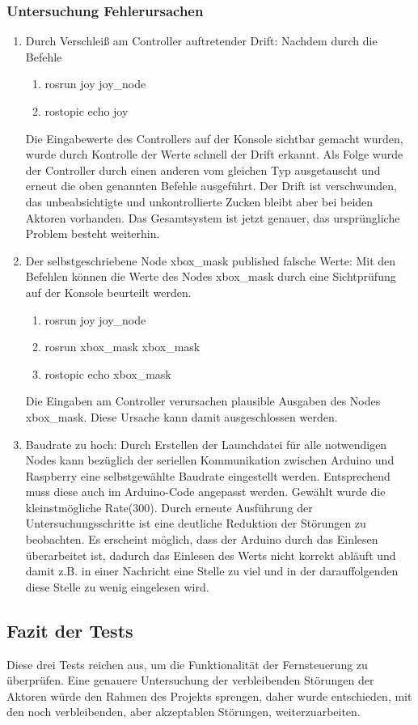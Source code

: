 \subsubsection{Untersuchung Fehlerursachen}
\begin{enumerate}
	\item Durch Verschleiß am Controller auftretender Drift: Nachdem durch die Befehle 
	\begin{enumerate}[label=\arabic*.]
		\item rosrun joy joy\_node
		\item rostopic echo joy
	\end{enumerate}
	Die Eingabewerte des Controllers auf der Konsole sichtbar gemacht wurden, wurde durch Kontrolle der Werte schnell der Drift erkannt. Als Folge wurde der Controller durch einen anderen vom gleichen Typ ausgetauscht und erneut die oben genannten Befehle ausgeführt. Der Drift ist verschwunden, das unbeabsichtigte und unkontrollierte Zucken bleibt aber bei beiden Aktoren vorhanden. Das Gesamtsystem ist jetzt genauer, das ursprüngliche Problem besteht weiterhin.
	\item Der selbstgeschriebene Node xbox\_mask published falsche Werte: Mit den Befehlen können die Werte des Nodes xbox\_mask durch eine Sichtprüfung auf der Konsole beurteilt werden. 
	\begin{enumerate} [label=\arabic*.]
		\item rosrun joy joy\_node
		\item rosrun xbox\_mask xbox\_mask
		\item rostopic echo xbox\_mask
	\end{enumerate}
	Die Eingaben am Controller verursachen plausible Ausgaben des Nodes xbox\_mask. Diese Ursache kann damit ausgeschlossen werden.
	\item Baudrate zu hoch: Durch Erstellen der Launchdatei für alle notwendigen Nodes kann bezüglich der seriellen Kommunikation zwischen Arduino und Raspberry eine selbstgewählte Baudrate eingestellt werden. Entsprechend muss diese auch im Arduino-Code angepasst werden. Gewählt wurde die kleinstmögliche Rate(300). Durch erneute Ausführung der Untersuchungsschritte ist eine deutliche Reduktion der Störungen zu beobachten. Es erscheint möglich, dass der Arduino durch das Einlesen überarbeitet ist, dadurch das Einlesen des Werts nicht korrekt abläuft und damit z.B. in einer Nachricht eine Stelle zu viel und in der darauffolgenden diese Stelle zu wenig eingelesen wird.
\end{enumerate}

\subsection{Fazit der Tests}

Diese drei Tests reichen aus, um die Funktionalität der Fernsteuerung zu überprüfen. Eine genauere Untersuchung der verbleibenden Störungen der Aktoren würde den Rahmen des Projekts sprengen, daher wurde entschieden, mit den noch verbleibenden, aber akzeptablen Störungen, weiterzuarbeiten.
